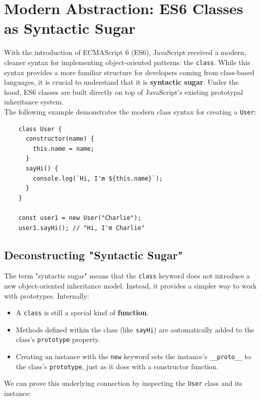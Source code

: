 \documentclass{scrbook}
\begin{document}
\chapter{Modern Abstraction: ES6 Classes as Syntactic Sugar}

With the introduction of ECMAScript 6 (ES6), JavaScript received a modern, cleaner syntax for implementing object-oriented patterns: the \texttt{class}. While this syntax provides a more familiar structure for developers coming from class-based languages, it is crucial to understand that it is \textbf{syntactic sugar}. Under the hood, ES6 classes are built directly on top of JavaScript's existing prototypal inheritance system. \\

The following example demonstrates the modern class syntax for creating a \texttt{User}:

\begin{lstlisting}
    class User {
      constructor(name) {
        this.name = name;
      }
      sayHi() {
        console.log(`Hi, I'm ${this.name}`);
      }
    }
    
    const user1 = new User("Charlie");
    user1.sayHi(); // "Hi, I'm Charlie"
\end{lstlisting}

\section{Deconstructing "Syntactic Sugar"}

The term "syntactic sugar" means that the \texttt{class} keyword does not introduce a new object-oriented inheritance model. Instead, it provides a simpler way to work with prototypes. Internally:

\begin{itemize}
    \item
    A \texttt{class} is still a special kind of \textbf{function}.
    
    \item
    Methods defined within the class (like \texttt{sayHi}) are automatically added to the class's \texttt{prototype} property.
    
    \item
    Creating an instance with the \texttt{new} keyword sets the instance's \texttt{\_\_proto\_\_} to the class's \texttt{prototype}, just as it does with a constructor function.
\end{itemize}

We can prove this underlying connection by inspecting the \texttt{User} class and its instance:
\end{document}
